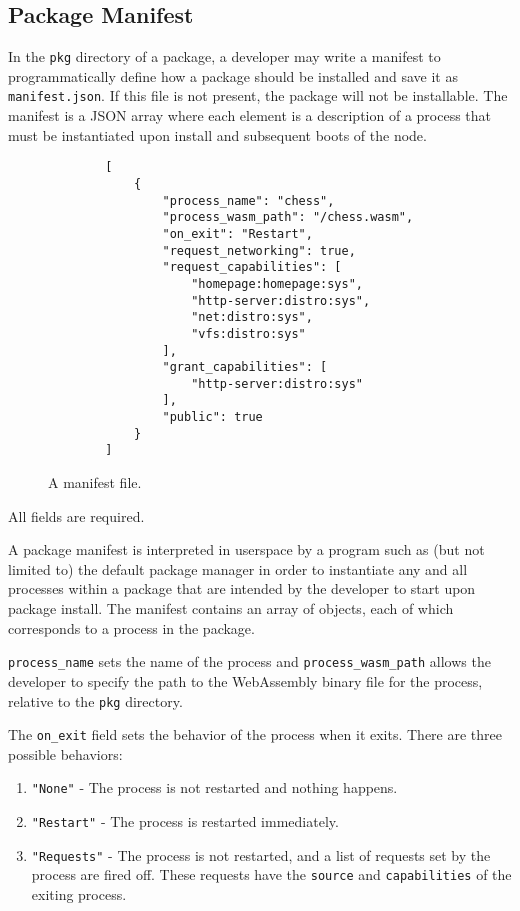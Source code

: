 \documentclass[runningheads]{llncs}
\begin{document}
\subsection{Package Manifest}
\label{sec:packagemanagermanifest}

In the \verb|pkg| directory of a package, a developer may write a manifest to programmatically define how a package should be installed and save it as \verb|manifest.json|.
If this file is not present, the package will not be installable.
The manifest is a JSON array where each element is a description of a process that must be instantiated upon install and subsequent boots of the node.

\begin{figure}[H]
    \centering
    \begin{verbatim}
        [
            {
                "process_name": "chess",
                "process_wasm_path": "/chess.wasm",
                "on_exit": "Restart",
                "request_networking": true,
                "request_capabilities": [
                    "homepage:homepage:sys",
                    "http-server:distro:sys",
                    "net:distro:sys",
                    "vfs:distro:sys"
                ],
                "grant_capabilities": [
                    "http-server:distro:sys"
                ],
                "public": true
            }
        ]
    \end{verbatim}
    \caption{A manifest file.}
    \label{fig:example manifest.json}
\end{figure}

All fields are required.

A package manifest is interpreted in userspace by a program such as (but not limited to) the default package manager in order to instantiate any and all processes within a package that are intended by the developer to start upon package install.
The manifest contains an array of objects, each of which corresponds to a process in the package.

\verb|process_name| sets the name of the process and \verb|process_wasm_path| allows the developer to specify the path to the WebAssembly binary file for the process, relative to the \verb|pkg| directory.

The \verb|on_exit| field sets the behavior of the process when it exits. There are three possible behaviors:
\begin{enumerate}
    \item \verb|"None"| - The process is not restarted and nothing happens.
	\item \verb|"Restart"| - The process is restarted immediately.
	\item \verb|"Requests"| - The process is not restarted, and a list of requests set by the process are fired off. These requests have the \verb|source| and \verb|capabilities| of the exiting process.
\end{enumerate}
\end{document}
